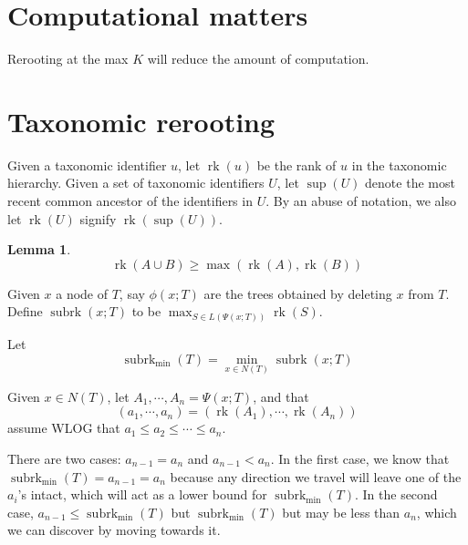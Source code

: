 \documentclass{amsart}
\newcommand{\treecut}{\Psi}
\newcommand{\rk}{\operatorname{rk}}
\newcommand{\subrk}{\operatorname{subrk}}
\newcommand{\minsubrk}{\subrk_{\min}}
\newcommand{\mrca}{\sup}
\newtheorem{lemma}{Lemma}
\begin{document}



\section{Computational matters}

Rerooting at the max $K$ will reduce the amount of computation.

\section{Taxonomic rerooting}

Given a taxonomic identifier $u$, let $\rk(u)$ be the rank of $u$ in the taxonomic hierarchy.
Given a set of taxonomic identifiers $U$, let $\mrca(U)$ denote the most recent common ancestor of the identifiers in $U$.
By an abuse of notation, we also let $\rk(U)$ signify $\rk(\mrca(U))$.

\begin{lemma}
  \[
  \rk(A \cup B) \geq \max(\rk(A),\rk(B))
  \]
\end{lemma}

Given $x$ a node of $T$, say $\phi(x;T)$ are the trees obtained by deleting $x$ from $T$.
Define $\subrk(x;T)$ to be $\max_{S \in L(\treecut(x;T))} \rk(S)$.

Let
\[
\minsubrk(T) = \min_{x \in N(T)} \subrk(x;T)
\]

Given $x \in N(T)$, let ${A_1,\cdots,A_n} = \treecut(x;T)$, and that
\[
  (a_1,\cdots,a_n) = (\rk(A_1), \cdots, \rk(A_n))
\]
assume WLOG that $a_1 \leq a_2 \leq \cdots \leq a_n$.

There are two cases: $a_{n-1} = a_n$ and $a_{n-1} < a_n$.
In the first case, we know that $\minsubrk(T) = a_{n-1} = a_n$ because any direction we travel will leave one of the $a_i$'s intact, which will act as a lower bound for $\minsubrk(T)$.
In the second case, $a_{n-1} \leq \minsubrk(T)$ but $\minsubrk(T)$ but may be less than $a_n$, which we can discover by moving towards it.
\end{document}
